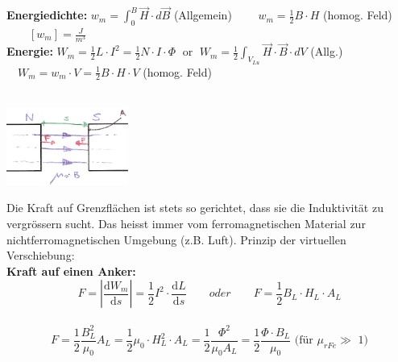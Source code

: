 
\textbf{Energiedichte:}
$\boxed{w_m=\int_0^B{\vec{H}\cdot d\vec{B}}}$ (Allgemein)
$\qquad\boxed{w_m=\frac{1}{2}B\cdot H}$ (homog. Feld) $\qquad [w_m]=\frac{J}{m^3}$\\

\textbf{Energie:}
$\boxed{W_m = \frac{1}{2} L \cdot I^2=\frac{1}{2} N \cdot I \cdot
\Phi \; \text{ or } \; W_m=\frac{1}{2} \int_{V_{Lu}} \vec H \cdot
\vec B \cdot dV}$ (Allg.)
$\quad\boxed{W_m=w_m \cdot V=\frac{1}{2} B \cdot H \cdot V}$ (homog. Feld)\\ \\
\parbox{5cm}{\includegraphics[width=4cm]{./bilder/m-kraft-mfeld.png}}
\parbox{13cm}{	
	Die Kraft auf Grenzflächen ist stets so gerichtet, dass sie die Induktivität
	zu vergrössern sucht. Das heisst immer vom ferromagnetischen Material zur
	nichtferromagnetischen Umgebung (z.B. Luft). Prinzip der virtuellen
	Verschiebung:\\
	\textbf{Kraft auf einen Anker:}
	$$\boxed{F = \left| \frac{\mathrm dW_m}{\mathrm ds} \right| = \frac{1}{2} I^2 \cdot 	
	\frac{\mathrm dL}{\mathrm ds} \qquad oder \qquad  F = \frac{1}{2} B_L \cdot H_L \cdot A_L}$$ 
	\\ 
	$$\boxed{ F= \frac{1}{2}\frac{B_L^2}{\mu_0}  A_L =  
				\frac{1}{2} \mu_0 \cdot H_L^2 \cdot A_L =  
				\frac{1}{2} \frac{\Phi^2}{\mu_0 A_L} =
				\frac{1}{2} \frac{\Phi \cdot B_L}{\mu_0}
			} \text{ (für } \mu_{rFe} \gg  \text{ 1)}$$}

\newpage
